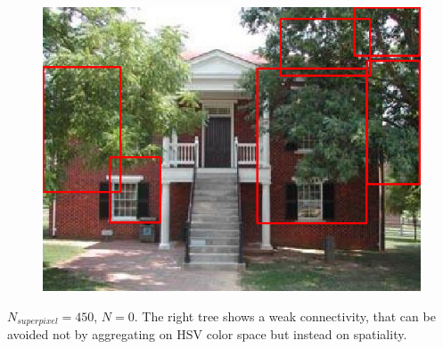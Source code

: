 \documentclass[a4paper,titlepaget]{article}
\begin{document}
\begin{figure}[htpb]
	\centering
	\includegraphics[width=.9\textwidth]{images/results/12fin}
\end{figure}
$N_{superpixel}=450$, $N=0$. The right tree shows a weak connectivity, that can be avoided not by aggregating on HSV color space but instead on spatiality.
\end{document}
